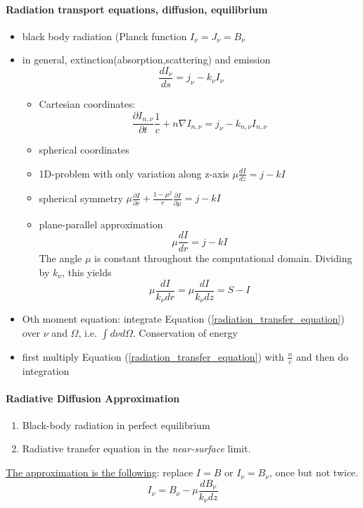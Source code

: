 \documentclass[10pt,a4paper]{article}
\begin{document}
\paragraph{Radiation transport equations, diffusion, equilibrium}
\begin{itemize}
\item black body radiation (Planck function $I_{\nu} = J_{\nu} = B_{\nu}$
\item in general, extinction(absorption,scattering) and emission
\begin{equation}
\frac{dI_{\nu}}{ds} = j_{\nu} - k_{\nu}I_{\nu}
\end{equation}
\begin{itemize}
\item Cartesian coordinates: 
\begin{equation}
\boxed{\frac{\partial I_{n,\nu}}{\partial t}\frac{1}{c} + n \nabla I_{n,\nu} = j_{\nu} - k_{n,\nu}I_{n,\nu}}
\label{radiation_transfer_equation}
\end{equation}
\item spherical coordinates 
\item 1D-problem with only variation along z-axis $\mu \frac{dI}{dz}  = j -kI$
\item spherical symmetry $\mu \frac{\partial I}{\partial r} + \frac{1-\mu^2}{r}\frac{\partial I}{\partial \mu} = j-kI$
\item plane-parallel approximation 
\begin{equation}
\boxed{\mu \frac{d I}{dr} = j - kI} 
\label{plane_parallel_radiation}
\end{equation}
The angle $\mu$ is constant throughout the computational domain.
Dividing by $k_{\nu}$, this yields 
\begin{equation}
\mu \frac{dI}{k_{\nu} dr} =  \mu \frac{dI}{k_{\nu} dz} = S-I
\end{equation}


\end{itemize}
\item Oth moment equation: integrate Equation (\ref{radiation_transfer_equation}) over $\nu$ and $\Omega$, i.e. $\int d\nu d\Omega$. Conservation of energy
\item first multiply Equation (\ref{radiation_transfer_equation}) with $\frac{n}{c}$ and then do integration
\end{itemize}

\paragraph{Radiative Diffusion Approximation}
\begin{enumerate}
\item Black-body radiation in perfect equilibrium
\item Radiative transfer equation in the \textit{near-surface} limit.
\end{enumerate}
\underline{The approximation is the following}: replace $\boxed{I = B}$ or $I_{\nu} = B_{\nu}$, once but not twice.
\begin{equation}
I_{\nu} = B_{\nu} - \mu \frac{dB_{\nu}}{k_{\nu}dz}
\end{equation}
\end{document}
